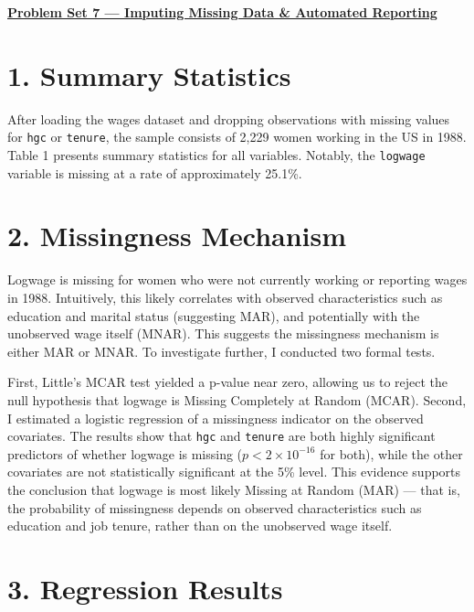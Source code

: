 \documentclass[12pt]{article}
\begin{document}
\begin{center}
\textbf{\underline{Problem Set 7 --- Imputing Missing Data \& Automated Reporting}}
\end{center}

\vspace{1em}

\section*{1. Summary Statistics}

After loading the wages dataset and dropping observations with missing values for \texttt{hgc} or \texttt{tenure}, the sample consists of 2,229 women working in the US in 1988. Table 1 presents summary statistics for all variables. Notably, the \texttt{logwage} variable is missing at a rate of approximately 25.1\%.

\vspace{1em}
\noindent

\vspace{1em}

\section*{2. Missingness Mechanism}

Logwage is missing for women who were not currently working or reporting wages in 1988. Intuitively, this likely correlates with observed characteristics such as education and marital status (suggesting MAR), and potentially with the unobserved wage itself (MNAR). This suggests the missingness mechanism is either MAR or MNAR. To investigate further, I conducted two formal tests.

First, Little's MCAR test yielded a p-value near zero, allowing us to reject the null hypothesis that logwage is Missing Completely at Random (MCAR). Second, I estimated a logistic regression of a missingness indicator on the observed covariates. The results show that \texttt{hgc} and \texttt{tenure} are both highly significant predictors of whether logwage is missing ($p < 2 \times 10^{-16}$ for both), while the other covariates are not statistically significant at the 5\% level. This evidence supports the conclusion that logwage is most likely Missing at Random (MAR) --- that is, the probability of missingness depends on observed characteristics such as education and job tenure, rather than on the unobserved wage itself.

\section*{3. Regression Results}
\end{document}
